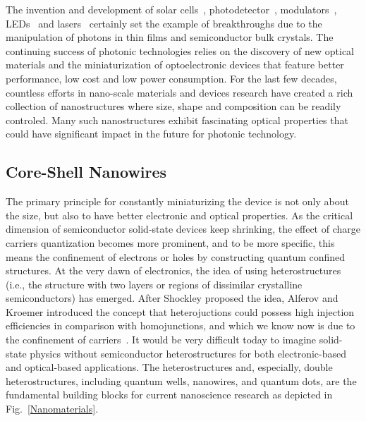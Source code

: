 The invention and development of solar
cells~\cite{sun2005organic,perlin1999space},
photodetector~\cite{razeghi1996semiconductor,rogalski2002infrared},
modulators~\cite{chen2011broadband,schuller2010plasmonics},
LEDs~\cite{spanggaard2004brief,schubert2005solid,schubert2005light} and
lasers~\cite{chow2012semiconductor,yablonovitch1987inhibited} certainly set the
example of breakthroughs due to the manipulation of photons in thin films and
semiconductor bulk crystals. The continuing success of photonic technologies
relies on the discovery of new optical materials and the miniaturization of
optoelectronic devices that feature better performance, low cost and low power
consumption. For the last few decades, countless efforts in nano-scale
materials and devices research have created a rich collection of nanostructures
where size, shape and composition can be readily controled. Many such
nanostructures exhibit fascinating optical properties that could have
significant impact in the future for photonic technology.

\subsection{Core-Shell Nanowires} \label{sec:intro_CSNW}

The primary principle for constantly miniaturizing the device is not only about
the size, but also to have better electronic and optical properties. As the
critical dimension of semiconductor solid-state devices keep shrinking, the
effect of charge carriers quantization becomes more prominent, and to be more
specific, this means the confinement of electrons or holes by constructing
quantum confined structures. At the very dawn of electronics, the idea of using
heterostructures (i.e., the structure with two layers or regions of dissimilar
crystalline semiconductors) has emerged. After Shockley proposed the idea,
Alferov and Kroemer introduced the concept that heterojuctions could possess
high injection efficiencies in comparison with homojunctions, and which we know
now is due to the confinement of carriers~\cite{alferov2000double}. It would be
very difficult today to imagine solid-state physics without semiconductor
heterostructures for both electronic-based and optical-based applications. The
heterostructures and, especially, double heterostructures, including quantum
wells, nanowires, and quantum dots, are the fundamental building blocks for
current nanoscience research as depicted in Fig.~\ref{Nanomaterials}.

